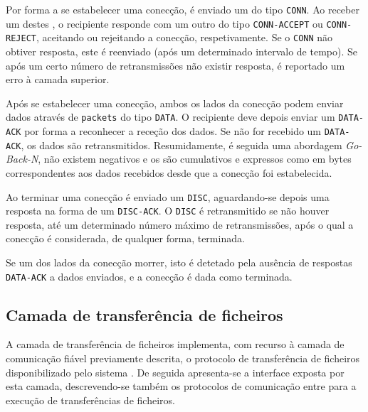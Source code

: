 Por forma a se estabelecer uma conecção, é enviado um  do tipo \texttt{CONN}. Ao receber um destes , o recipiente responde com um outro  do tipo \texttt{CONN-ACCEPT} ou \texttt{CONN-REJECT}, aceitando ou rejeitando a conecção, respetivamente. Se o  \texttt{CONN} não obtiver resposta, este é reenviado (após um determinado intervalo de tempo). Se após um certo número de retransmissões não existir resposta, é reportado um erro à camada superior.

Após se estabelecer uma conecção, ambos os lados da conecção podem enviar dados através de \texttt{packets} do tipo \texttt{DATA}. O recipiente deve depois enviar um  \texttt{DATA-ACK} por forma a reconhecer a receção dos dados. Se não for recebido um  \texttt{DATA-ACK}, os dados são retransmitidos. Resumidamente, é seguida uma abordagem \emph{Go-Back-N}, não existem  negativos e os  são cumulativos e expressos como  em bytes correspondentes aos dados recebidos desde que a conecção foi estabelecida.

Ao terminar uma conecção é enviado um  \texttt{DISC}, aguardando-se depois uma resposta na forma de um  \texttt{DISC-ACK}. O  \texttt{DISC} é retransmitido se não houver resposta, até um determinado número máximo de retransmissões, após o qual a conecção é considerada, de qualquer forma, terminada.

Se um dos lados da conecção morrer, isto é detetado pela ausência de respostas \texttt{DATA-ACK} a dados enviados, e a conecção é dada como terminada.


\subsection{Camada de transferência de ficheiros}

A camada de transferência de ficheiros implementa, com recurso à camada de comunicação fiável previamente descrita, o protocolo  de transferência de ficheiros disponibilizado pelo sistema \SYS. De seguida apresenta-se a interface exposta por esta camada, descrevendo-se também os protocolos de comunicação entre  para a execução de transferências de ficheiros.


